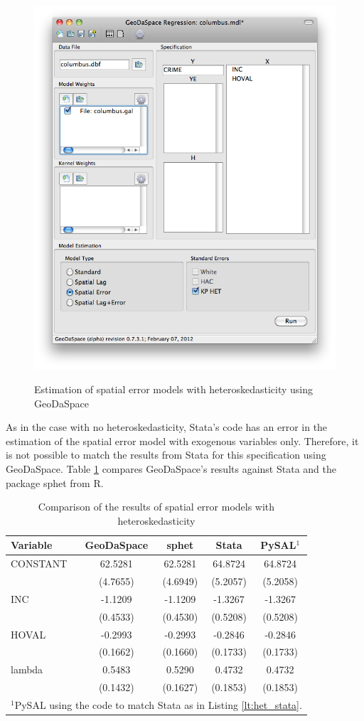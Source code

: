 \documentclass{article}
\begin{document}
\begin{figure}[htb]
\caption{Estimation of spatial error models with heteroskedasticity using GeoDaSpace}
\label{f:GS_het}
\begin{center}
\includegraphics[width=0.7\linewidth]{GS_het.png}\\
\end{center}
\end{figure}

As in the case with no heteroskedasticity, Stata's code has an error in the estimation of the spatial error model with exogenous variables only. Therefore, it is not possible to match the results from Stata for this specification using GeoDaSpace. Table \ref{t:res_het} compares GeoDaSpace's results against Stata and the package sphet from R. 

\begin{table}[htpb]
\caption{Comparison of the results of spatial error models with heteroskedasticity}
\label{t:res_het}
\centering
\begin{small}
\begin{tabular}{l|cccc} \hline
\textbf{Variable}&\textbf{GeoDaSpace}&\textbf{sphet}&\textbf{Stata}&\textbf{PySAL$^1$}\\ \hline
CONSTANT&62.5281&62.5281&64.8724&64.8724\\
&(4.7655)&(4.6949)&(5.2057)&(5.2058)\\
INC&-1.1209&-1.1209&-1.3267&-1.3267\\
&(0.4533)&(0.4530)&(0.5208)&(0.5208)\\
HOVAL&-0.2993&-0.2993&-0.2846&-0.2846\\
&(0.1662)&(0.1660)&(0.1733)&(0.1733)\\
lambda&0.5483&0.5290&0.4732&0.4732\\
&(0.1432)&(0.1627)&(0.1853)&(0.1853)\\
\hline
\multicolumn{5}{l}{\scriptsize{$^1$PySAL using the code to match Stata as in Listing \ref{lt:het_stata}.}} \\
\end{tabular}
\end{small}
\end{table}
\end{document}
